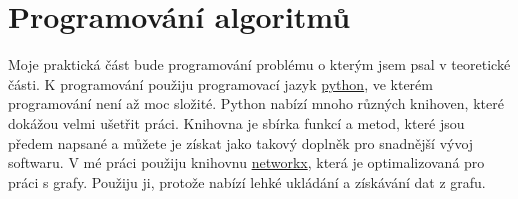 \chapter{Programování algoritmů}
\label{chap:programovani}

Moje praktická část bude programování problému o kterým jsem psal v teoretické části. K programování použiju programovací jazyk \href{https://www.python.org/}{python}, ve kterém programování není až moc složité. Python nabízí mnoho různých knihoven, které dokážou velmi ušetřit práci. Knihovna je sbírka funkcí a metod, které jsou předem napsané a můžete je získat jako takový doplněk pro snadnější vývoj softwaru. V mé práci použiju knihovnu \href{https://networkx.org/}{networkx}, která je optimalizovaná pro práci s grafy. Použiju ji, protože nabízí lehké ukládání a získávání dat z grafu.


